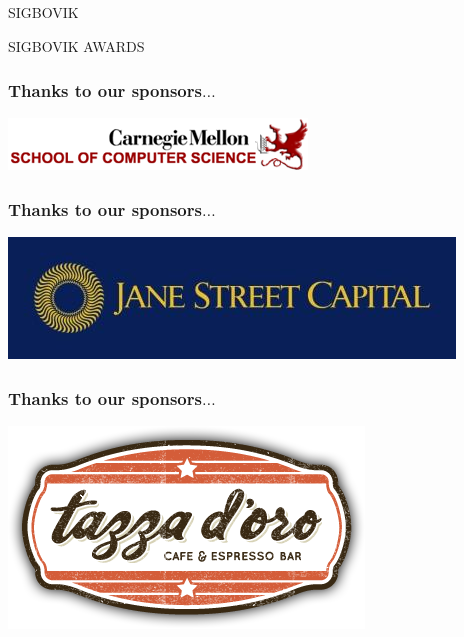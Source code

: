 \documentclass{beamer}
\begin{document}
\begin{frame}
\centering
\Huge SIGBOVIK
\end{frame}

\begin{frame}
\Huge SIGBOVIK AWARDS
\end{frame}

\begin{frame}
\frametitle{Thanks to our sponsors$\dots$}
\includegraphics[scale=.8]{scs.png}
\end{frame}

\begin{frame}
\frametitle{Thanks to our sponsors$\dots$}
\includegraphics[scale=.8]{janestreet.jpg}
\end{frame}

\begin{frame}
\frametitle{Thanks to our sponsors$\dots$}
\includegraphics[scale=.5]{tazza.png}
\end{frame}
\end{document}
